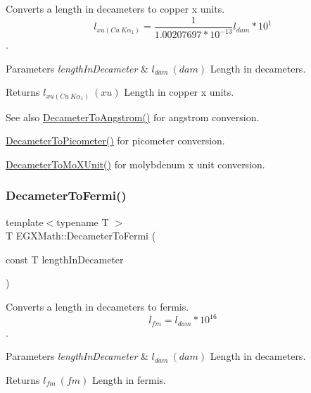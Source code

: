 Converts a length in decameters to copper x units. \[ l_{xu(Cu\ K\alpha_1)}= \frac{1}{1.00207697*10^{-13}} l_{dam} * 10^{1}\]. 


\begin{DoxyParams}{Parameters}
{\em length\+In\+Decameter} & $ l_{dam}\ (dam)$ Length in decameters. \\
\hline
\end{DoxyParams}
\begin{DoxyReturn}{Returns}
$ l_{xu(Cu\ K\alpha_1)}\ (xu)$ Length in copper x units. 
\end{DoxyReturn}
\begin{DoxySeeAlso}{See also}
\mbox{\hyperlink{group___e_g_x_math-_conversions-_length_conversions-_s_i-_decameter-_non-_s_i_ga2ea722ea1c773432c2680fe6ebd67638}{Decameter\+To\+Angstrom()}} for angstrom conversion. 

\mbox{\hyperlink{group___e_g_x_math-_conversions-_length_conversions-_s_i-_decameter-_s_i_gab265bbced03f7b08cf4ad0db29da6dfd}{Decameter\+To\+Picometer()}} for picometer conversion. 

\mbox{\hyperlink{group___e_g_x_math-_conversions-_length_conversions-_s_i-_decameter-_non-_s_i_ga9e345feeb2568ded9fdceaf1d23d0ca6}{Decameter\+To\+Mo\+X\+Unit()}} for molybdenum x unit conversion. 
\end{DoxySeeAlso}
\mbox{\label{group___e_g_x_math-_conversions-_length_conversions-_s_i-_decameter-_non-_s_i_gadc348f062b782f64f13784377f032f9b}} 
\subsubsection{\texorpdfstring{Decameter\+To\+Fermi()}{DecameterToFermi()}}
{\footnotesize\ttfamily template$<$typename T $>$ \\
T E\+G\+X\+Math\+::\+Decameter\+To\+Fermi (\begin{DoxyParamCaption}\item[{const T}]{length\+In\+Decameter }\end{DoxyParamCaption})}



Converts a length in decameters to fermis. \[ l_{fm}=l_{dam} * 10^{16} \]. 


\begin{DoxyParams}{Parameters}
{\em length\+In\+Decameter} & $ l_{dam}\ (dam)$ Length in decameters. \\
\hline
\end{DoxyParams}
\begin{DoxyReturn}{Returns}
$ l_{fm}\ (fm)$ Length in fermis. 
\end{DoxyReturn}
\mbox{\label{group___e_g_x_math-_conversions-_length_conversions-_s_i-_decameter-_non-_s_i_gaf3c7befd051b823dc17aca5318cae689}} 
